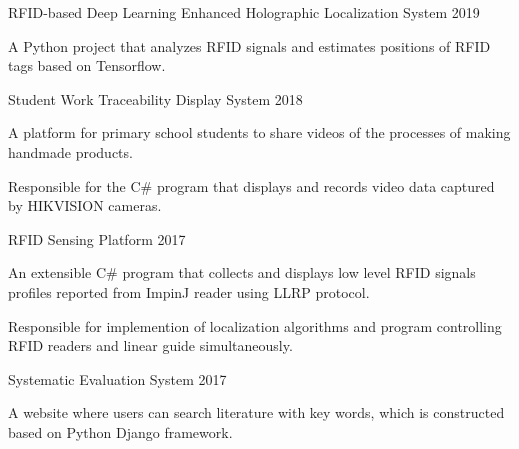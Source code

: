 \begin{cventries}
  \cventry
    {} %
    {RFID-based Deep Learning Enhanced Holographic Localization System} %
    {} %
    {2019} %
    {
      \begin{cvitems} %
        \item {A Python project that analyzes RFID signals and estimates positions of RFID tags based on Tensorflow.}
      \end{cvitems}
    }
    \EntryGap
  \cventry
    {} %
    {Student Work Traceability Display System} %
    {} %
    {2018} %
    {
      \begin{cvitems} %
        \item {A platform for primary school students to share videos of the processes of making handmade products.} 
        \item {Responsible for the C\# program that displays and records video data captured by HIKVISION cameras.}
      \end{cvitems}
    }
    \EntryGap
  \cventry
    {} %
    {RFID Sensing Platform} %
    {} %
    {2017} %
    {
      \begin{cvitems} %
        \item {An extensible C\# program that collects and displays low level RFID signals profiles reported from ImpinJ reader using LLRP protocol.}
        \item {Responsible for implemention of localization algorithms and program controlling RFID readers and linear guide simultaneously.}
      \end{cvitems}
    }
    \EntryGap
  \cventry
    {} %
    {Systematic Evaluation System} %
    {} %
    {2017} %
    {
      \begin{cvitems} %
        \item {A website where users can search literature with key words, which is constructed based on Python Django framework.}
      \end{cvitems}
    }
\end{cventries}
